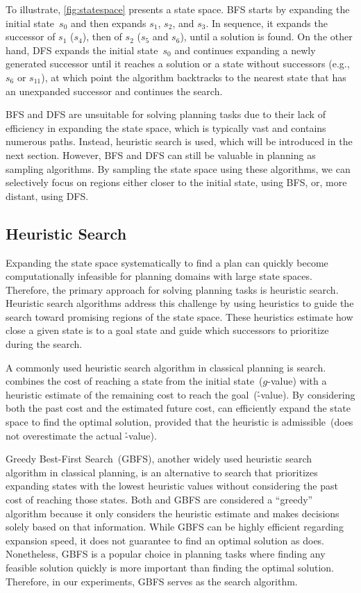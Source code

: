 To illustrate, \cref{fig:statespace} presents a state space. BFS starts by expanding the initial state~$s_0$ and then expands $s_1$, $s_2$, and $s_3$. In sequence, it expands the successor of $s_1$ ($s_4$), then of $s_2$ ($s_5$ and $s_6$), until a solution is found. On the other hand, DFS expands the initial state~$s_0$ and continues expanding a newly generated successor until it reaches a solution or a state without successors (e.g.,~$s_6$ or $s_{11}$), at which point the algorithm backtracks to the nearest state that has an unexpanded successor and continues the search.

BFS and DFS are unsuitable for solving planning tasks due to their lack of efficiency in expanding the state space, which is typically vast and contains numerous paths. Instead, heuristic search is used, which will be introduced in the next section. However, BFS and DFS can still be valuable in planning as sampling algorithms. By sampling the state space using these algorithms, we can selectively focus on regions either closer to the initial state, using BFS, or, more distant, using DFS.

\subsection{Heuristic Search}
\label{sec:heuristic-search}

Expanding the state space systematically to find a plan can quickly become computationally infeasible for planning domains with large state spaces. Therefore, the primary approach for solving planning tasks is heuristic search. Heuristic search algorithms address this challenge by using heuristics to guide the search toward promising regions of the state space. These heuristics estimate how close a given state is to a goal state and guide which successors to prioritize during the search.

A commonly used heuristic search algorithm in classical planning is \astar search. \astar combines the cost of reaching a state from the initial state~($g$-value) with a heuristic estimate of the remaining cost to reach the goal~(\h-value). By considering both the past cost and the estimated future cost, \astar can efficiently expand the state space to find the optimal solution, provided that the heuristic is admissible~(does not overestimate the actual \h-value).

Greedy Best-First Search~(GBFS), another widely used heuristic search algorithm in classical planning, is an alternative to \astar search that prioritizes expanding states with the lowest heuristic values without considering the past cost of reaching those states. Both \astar and GBFS are considered a ``greedy'' algorithm because it only considers the heuristic estimate and makes decisions solely based on that information. While GBFS can be highly efficient regarding expansion speed, it does not guarantee to find an optimal solution as \astar does. Nonetheless, GBFS is a popular choice in planning tasks where finding any feasible solution quickly is more important than finding the optimal solution. Therefore, in our experiments, GBFS serves as the search algorithm.

